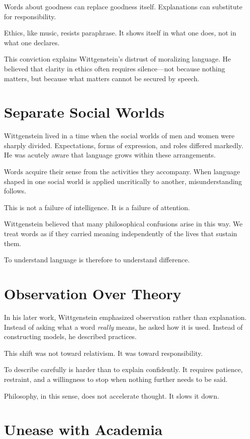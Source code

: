 \documentclass[11pt]{article}
\begin{document}
Words about goodness can replace goodness itself.  
Explanations can substitute for responsibility.  

Ethics, like music, resists paraphrase. It shows itself in what one does, not in what one declares.

This conviction explains Wittgenstein’s distrust of moralizing language. He believed that clarity in ethics often requires silence—not because nothing matters, but because what matters cannot be secured by speech.

\section*{Separate Social Worlds}

Wittgenstein lived in a time when the social worlds of men and women were sharply divided. Expectations, forms of expression, and roles differed markedly. He was acutely aware that language grows within these arrangements.

Words acquire their sense from the activities they accompany. When language shaped in one social world is applied uncritically to another, misunderstanding follows.

This is not a failure of intelligence. It is a failure of attention.

Wittgenstein believed that many philosophical confusions arise in this way. We treat words as if they carried meaning independently of the lives that sustain them.

To understand language is therefore to understand difference.

\section*{Observation Over Theory}

In his later work, Wittgenstein emphasized observation rather than explanation. Instead of asking what a word \emph{really} means, he asked how it is used. Instead of constructing models, he described practices.

This shift was not toward relativism. It was toward responsibility.

To describe carefully is harder than to explain confidently. It requires patience, restraint, and a willingness to stop when nothing further needs to be said.

Philosophy, in this sense, does not accelerate thought. It slows it down.

\section*{Unease with Academia}
\end{document}
